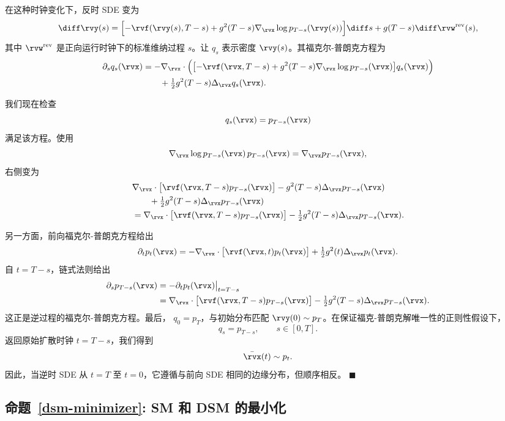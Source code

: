 在这种时钟变化下，反时 SDE 变为
\[
\diff\rvy(s)
=
\Bigl[
-\rvf(\rvy(s),T-s)
+
g^2(T-s)\nabla_{\rvx}\log p_{T-s}(\rvy(s))
\Bigr]\diff s
+
g(T-s)\diff\rvw^{\mathrm{rev}}(s),
\]
其中 $\rvw^{\mathrm{rev}}$ 是正向运行时钟下的标准维纳过程 $s$。让 $q_s$ 表示密度 $\rvy(s)$。其福克尔-普朗克方程为
\begin{align*}
\partial_s q_s(\rvx)
&=
-\nabla_{\rvx}\cdot
\Bigl(
\bigl[
-\rvf(\rvx,T-s)
+
g^2(T-s)\nabla_{\rvx}\log p_{T-s}(\rvx)
\bigr]
q_s(\rvx)
\Bigr)
\\
&\qquad
+
\tfrac12 g^2(T-s)\Delta_{\rvx}q_s(\rvx).
\end{align*}

我们现在检查
\[
q_s(\rvx)=p_{T-s}(\rvx)
\]
满足该方程。使用
\[
\nabla_{\rvx}\log p_{T-s}(\rvx)\,p_{T-s}(\rvx)
=
\nabla_{\rvx}p_{T-s}(\rvx),
\]
右侧变为
\begin{align*}
&\nabla_{\rvx}\cdot
\bigl[
\rvf(\rvx,T-s)p_{T-s}(\rvx)
\bigr]
-
g^2(T-s)\Delta_{\rvx}p_{T-s}(\rvx)
\\
&\qquad
+
\tfrac12 g^2(T-s)\Delta_{\rvx}p_{T-s}(\rvx)
\\
&=
\nabla_{\rvx}\cdot
\bigl[
\rvf(\rvx,T-s)p_{T-s}(\rvx)
\bigr]
-
\tfrac12 g^2(T-s)\Delta_{\rvx}p_{T-s}(\rvx).
\end{align*}

另一方面，前向福克尔-普朗克方程给出
\[
\partial_t p_t(\rvx)
=
-\nabla_{\rvx}\cdot
\bigl[\rvf(\rvx,t)p_t(\rvx)\bigr]
+
\tfrac12g^2(t)\Delta_{\rvx}p_t(\rvx).
\]
自 $t=T-s$，链式法则给出
\begin{align*}
\partial_s p_{T-s}(\rvx)
&=
-\partial_t p_t(\rvx)\big|_{t=T-s}
\\
&=
\nabla_{\rvx}\cdot
\bigl[
\rvf(\rvx,T-s)p_{T-s}(\rvx)
\bigr]
-
\tfrac12g^2(T-s)\Delta_{\rvx}p_{T-s}(\rvx).
\end{align*}
这正是逆过程的福克尔-普朗克方程。最后， $q_0=p_T$，与初始分布匹配
$\rvy(0)\sim p_T$。在保证福克-普朗克解唯一性的正则性假设下，
\[
q_s=p_{T-s},
\qquad s\in[0,T].
\]
返回原始扩散时钟 $t=T-s$，我们得到
\[
\bar\rvx(t)\sim p_t.
\]
因此，当逆时 SDE 从 $t=T$ 至 $t=0$，它遵循与前向 SDE 相同的边缘分布，但顺序相反。
\hfill$\blacksquare$

\subsection{命题~\ref{dsm-minimizer}: SM 和 DSM 的最小化}\label{app-sec:min-dsm}


